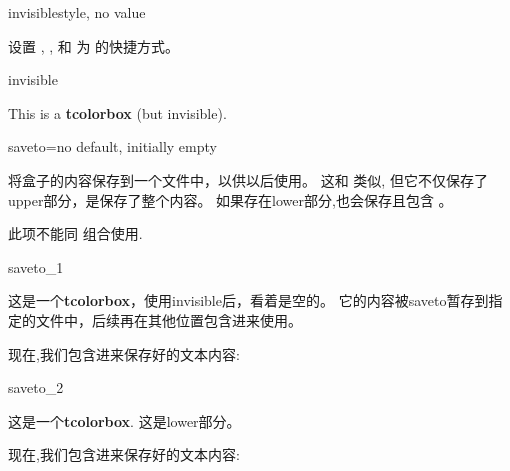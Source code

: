 \begin{docTcbKey}[][doc new and updated={2015-01-06}{2019-03-01}]{invisible}{}{style, no value}

设置 , , 和  为  的快捷方式。
\begin{exdispExample}{invisible}
\begin{tcolorbox}[invisible]
This is a \textbf{tcolorbox} (but invisible).
\end{tcolorbox}
\end{exdispExample}
\end{docTcbKey}




\begin{docTcbKey}[][doc new=2015-05-04]{saveto}{=}{no default, initially empty}
  
  将盒子的内容保存到一个文件中，以供以后使用。
  这和  类似, 但它不仅保存了upper部分，是保存了整个内容。
  如果存在lower部分,也会保存且包含 。
  
  \begin{marker}
  此项不能同  组合使用.
  \end{marker}
  
  \begin{exdispExample}{saveto_1}
  \begin{tcolorbox}[invisible%
    ,saveto=\jobname_mysave1.tex
    ,colback=white]
  这是一个\textbf{tcolorbox}，使用invisible后，看着是空的。
  它的内容被saveto暂存到指定的文件中，后续再在其他位置包含进来使用。
  \end{tcolorbox}
  
  现在,我们包含进来保存好的文本内容:\\
  
  \end{exdispExample}
  
  \begin{exdispExample}{saveto_2}
  \begin{tcolorbox}[saveto=\jobname_mysave2.tex]
  这是一个\textbf{tcolorbox}.
  \tcblower
  这是lower部分。
  \end{tcolorbox}
  
  现在,我们包含进来保存好的文本内容:
  \begin{tcolorbox}[colframe=red,colback=red!10,
  coltitle=black,colbacktitle=red!20
  ,sidebyside%
  ,title=在这里我们看到保存的内容包括lower部分]
  
  \end{tcolorbox}
  \end{exdispExample}
  \end{docTcbKey}

